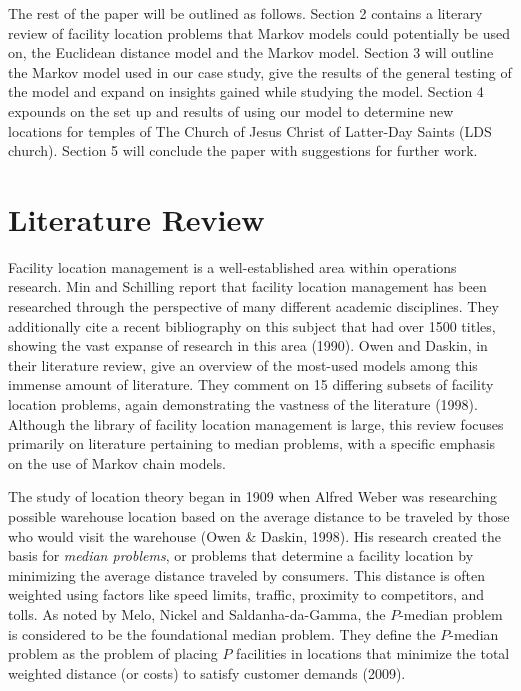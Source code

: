\documentclass[twoside,twocolumn]{article}
\begin{document}
The rest of the paper will be outlined as follows.
Section 2 contains a literary review of facility location problems that Markov models could potentially be used on, the Euclidean distance model and the Markov model.
Section 3 will outline the Markov model used in our case study, give the results of the general testing of the model and expand on insights gained while studying the model.
Section 4 expounds on the set up and results of using our model to determine new locations for temples of The Church of Jesus Christ of Latter-Day Saints (LDS church).
Section 5 will conclude the paper with suggestions for further work.

\section{Literature Review}

Facility location management is a well-established area within operations research.
Min and Schilling report that facility location management has been researched through the perspective of many different academic disciplines. %
They additionally cite a recent bibliography on this subject that had over 1500 titles, showing the vast expanse of research in this area (1990).
Owen and Daskin, in their literature review, give an overview of the most-used models among this immense amount of literature.
They comment on 15 differing subsets of facility location problems, again demonstrating the vastness of the literature (1998).
Although the library of facility location management is large, this review focuses primarily on literature pertaining to median problems, with a specific emphasis on the use of Markov chain models.

The study of location theory began in 1909 when Alfred Weber was researching possible warehouse location based on the average distance to be traveled by those who would visit the warehouse (Owen \& Daskin, 1998).
His research created the basis for {\em median problems}, or problems that determine a facility location by minimizing the average distance traveled by consumers.
This distance is often weighted using factors like speed limits, traffic, proximity to competitors, and tolls.
As noted by Melo, Nickel and Saldanha-da-Gamma, the $P$-median problem is considered to be the foundational median problem.
They define the $P$-median problem as the problem of placing $P$ facilities in locations that minimize the total weighted distance (or costs) to satisfy customer demands (2009).
\end{document}
